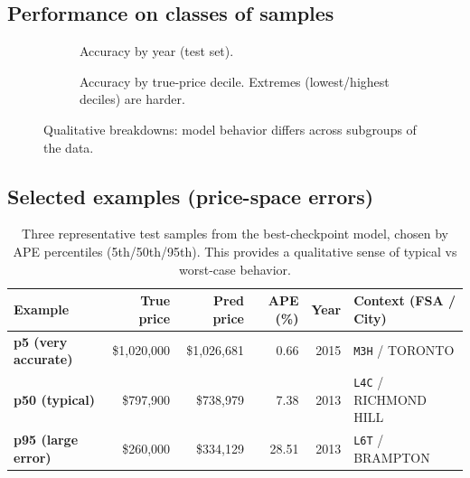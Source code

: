 \documentclass[11pt]{article}
\begin{document}
\subsection{Performance on classes of samples}
\begin{figure}[h]
\centering
\begin{subfigure}{0.49\linewidth}
\centering
{}
\caption{Accuracy by year (test set).}
\end{subfigure}
\hfill
\begin{subfigure}{0.49\linewidth}
\centering
{}
\caption{Accuracy by true-price decile. Extremes (lowest/highest deciles) are harder.}
\end{subfigure}
\caption{Qualitative breakdowns: model behavior differs across subgroups of the data.}
\label{fig:ann-subgroups}
\end{figure}

\subsection{Selected examples (price-space errors)}
\begin{table}[h]
\centering
\small
\begin{tabularx}{\linewidth}{@{}lrrrr>{\raggedright\arraybackslash}X@{}}
\toprule
Example & True price & Pred price & APE (\%) & Year & Context (FSA / City) \\
\midrule
\textbf{p5 (very accurate)} & \$1{,}020{,}000 & \$1{,}026{,}681 & 0.66 & 2015 & \texttt{M3H} / TORONTO \\
\textbf{p50 (typical)} & \$797{,}900 & \$738{,}979 & 7.38 & 2013 & \texttt{L4C} / RICHMOND HILL \\
\textbf{p95 (large error)} & \$260{,}000 & \$334{,}129 & 28.51 & 2013 & \texttt{L6T} / BRAMPTON \\
\bottomrule
\end{tabularx}
\caption{Three representative test samples from the best-checkpoint model, chosen by APE percentiles (5th/50th/95th). This provides a qualitative sense of typical vs worst-case behavior.}
\label{tab:ann-examples}
\end{table}
\end{document}
